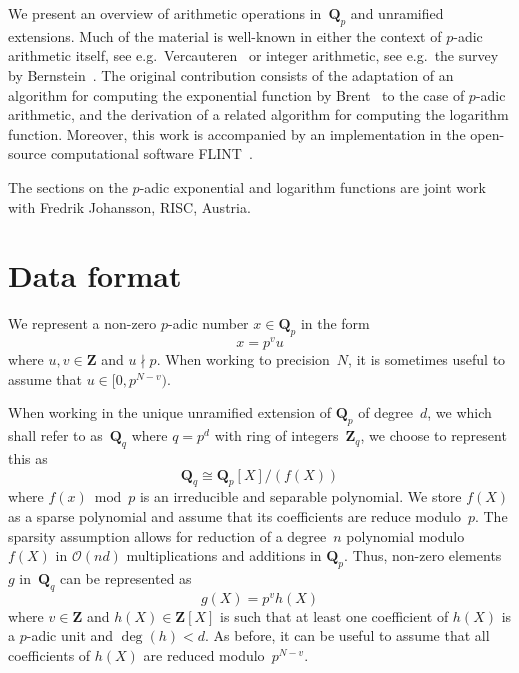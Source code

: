 We present an overview of arithmetic operations in~$\mathbf{Q}_p$ 
and unramified extensions.  Much of the material is well-known in 
either the context of $p$-adic arithmetic itself, see e.g.\ 
Vercauteren~\citep[\S 12]{HEHCC2005} or integer arithmetic, 
see e.g.\ the survey by Bernstein~\citep{Bernstein2008}. 
The original contribution consists of the adaptation of an algorithm 
for computing the exponential function by Brent~\citep{Brent1976} 
to the case of $p$-adic arithmetic, and the derivation of a related 
algorithm for computing the logarithm function.  Moreover, this 
work is accompanied by an implementation in the open-source computational 
software {\sc FLINT}~\citep{FLINT}.

The sections on the $p$-adic exponential and logarithm functions 
are joint work with Fredrik Johansson, RISC, Austria.

\section{Data format}

We represent a non-zero $p$-adic number $x \in \mathbf{Q}_p$ in the form 
\begin{equation}
x = p^v u
\end{equation}
where $u, v \in \mathbf{Z}$ and $u \nmid p$.  When working to precision~$N$, 
it is sometimes useful to assume that $u \in [0,p^{N-v})$.

When working in the unique unramified extension of $\mathbf{Q}_p$ of 
degree~$d$, we which shall refer to as~$\mathbf{Q}_q$ where $q = p^d$ 
with ring of integers~$\mathbf{Z}_q$, we choose to represent this as 
\begin{equation}
\mathbf{Q}_q \cong \mathbf{Q}_p[X] / (f(X))
\end{equation}
where $f(x) \bmod p$ is an irreducible and separable polynomial.  We store 
$f(X)$ as a sparse polynomial and assume that its coefficients are 
reduce modulo~$p$.  The sparsity assumption allows for reduction of a 
degree~$n$ polynomial modulo~$f(X)$ in $\mathcal{O}(nd)$ multiplications 
and additions in $\mathbf{Q}_p$.  Thus, non-zero elements~$g$ 
in~$\mathbf{Q}_q$ can be represented as 
\begin{equation}
g(X) = p^v h(X)
\end{equation}
where $v \in \mathbf{Z}$ and $h(X) \in \mathbf{Z}[X]$ is such that at least 
one coefficient of $h(X)$ is a $p$-adic unit and $\deg(h) < d$.  As before, 
it can be useful to assume that all coefficients of $h(X)$ are reduced 
modulo~$p^{N-v}$.

